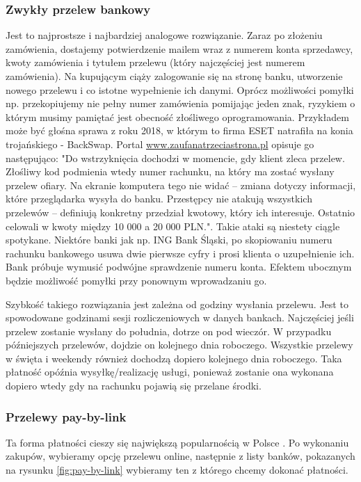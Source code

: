 \documentclass[12pt]{article}
\numberwithin{figure}{section}
\begin{document}
\begin{sloppypar}
\subsubsection{Zwykły przelew bankowy}
Jest to najprostsze i najbardziej analogowe rozwiązanie. Zaraz po złożeniu zamówienia, dostajemy potwierdzenie mailem wraz z numerem konta sprzedawcy, kwoty zamówienia i tytułem przelewu (który najczęściej jest numerem zamówienia). Na kupującym ciąży zalogowanie się na stronę banku, utworzenie nowego przelewu i co istotne wypełnienie ich danymi. Oprócz możliwości pomyłki np. przekopiujemy nie pełny numer zamówienia pomijając jeden znak, ryzykiem o którym musimy pamiętać jest obecność złośliwego oprogramowania. Przykładem może być głośna sprawa z roku 2018, w którym to firma ESET natrafiła na konia trojańskiego - BackSwap. Portal \url{www.zaufanatrzeciastrona.pl} opisuje go następująco: "Do wstrzyknięcia dochodzi w momencie, gdy klient zleca przelew. Złośliwy kod podmienia wtedy numer rachunku, na który ma zostać wysłany przelew ofiary. Na ekranie komputera tego nie widać – zmiana dotyczy informacji, które przeglądarka wysyła do banku. Przestępcy nie atakują wszystkich przelewów – definiują konkretny przedział kwotowy, który ich interesuje. Ostatnio celowali w kwoty między 10 000 a 20 000 PLN."\cite{backswap}.
Takie ataki są niestety ciągle spotykane. Niektóre banki jak np. ING Bank Śląski, po skopiowaniu numeru rachunku bankowego usuwa dwie pierwsze cyfry i prosi klienta o uzupełnienie ich. Bank próbuje wymusić podwójne sprawdzenie numeru konta. Efektem ubocznym będzie możliwość pomyłki przy ponownym wprowadzaniu go.

Szybkość takiego rozwiązania jest zależna od godziny wysłania przelewu. Jest to spowodowane godzinami sesji rozliczeniowych w danych bankach. Najczęściej jeśli przelew zostanie wysłany do południa, dotrze on pod wieczór. W przypadku późniejszych przelewów, dojdzie on kolejnego dnia roboczego. Wszystkie przelewy w święta i weekendy również dochodzą dopiero kolejnego dnia roboczego. Taka płatność opóźnia wysyłkę/realizację usługi, ponieważ zostanie ona wykonana dopiero wtedy gdy na rachunku pojawią się przelane środki. 

\subsubsection{Przelewy pay-by-link}
Ta forma płatności cieszy się największą popularnością w Polsce \cite{jak-placa-polacy}. Po wykonaniu zakupów, wybieramy opcję przelewu online, następnie z listy banków, pokazanych na rysunku \ref{fig:pay-by-link} wybieramy ten z którego chcemy dokonać płatności. 


\end{sloppypar}
\end{document}
